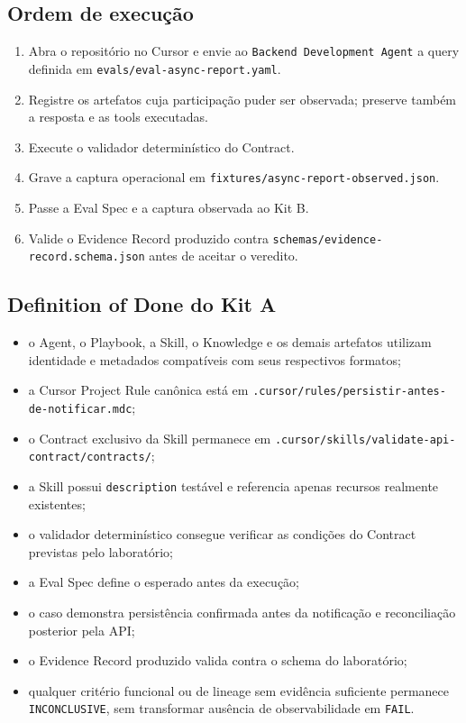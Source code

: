 \documentclass[
  10pt,
  a4paper,
  oneside]{book}
\providecommand{\tightlist}{%
  \setlength{\itemsep}{0pt}\setlength{\parskip}{0pt}}
\begin{document}
\hypertarget{ordem-de-execuuxe7uxe3o}{%
\subsection{Ordem de execução}\label{ordem-de-execuuxe7uxe3o}}

\begin{enumerate}
\def\labelenumi{\arabic{enumi}.}
\tightlist
\item
  Abra o repositório no Cursor e envie ao
  \texttt{Backend\ Development\ Agent} a query definida em
  \texttt{evals/eval-async-report.yaml}.
\item
  Registre os artefatos cuja participação puder ser observada; preserve
  também a resposta e as tools executadas.
\item
  Execute o validador determinístico do Contract.
\item
  Grave a captura operacional em
  \texttt{fixtures/async-report-observed.json}.
\item
  Passe a Eval Spec e a captura observada ao Kit B.
\item
  Valide o Evidence Record produzido contra
  \texttt{schemas/evidence-record.schema.json} antes de aceitar o
  veredito.
\end{enumerate}

\hypertarget{definition-of-done-do-kit-a}{%
\subsection{Definition of Done do Kit
A}\label{definition-of-done-do-kit-a}}

\begin{itemize}
\tightlist
\item
  o Agent, o Playbook, a Skill, o Knowledge e os demais artefatos
  utilizam identidade e metadados compatíveis com seus respectivos
  formatos;
\item
  a Cursor Project Rule canônica está em
  \texttt{.cursor/rules/persistir-antes-de-notificar.mdc};
\item
  o Contract exclusivo da Skill permanece em
  \texttt{.cursor/skills/validate-api-contract/contracts/};
\item
  a Skill possui \texttt{description} testável e referencia apenas
  recursos realmente existentes;
\item
  o validador determinístico consegue verificar as condições do Contract
  previstas pelo laboratório;
\item
  a Eval Spec define o esperado antes da execução;
\item
  o caso demonstra persistência confirmada antes da notificação e
  reconciliação posterior pela API;
\item
  o Evidence Record produzido valida contra o schema do laboratório;
\item
  qualquer critério funcional ou de lineage sem evidência suficiente
  permanece \texttt{INCONCLUSIVE}, sem transformar ausência de
  observabilidade em \texttt{FAIL}.
\end{itemize}
\end{document}
